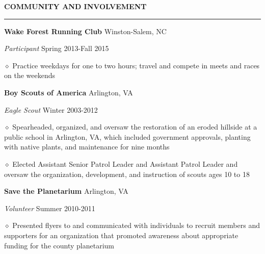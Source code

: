 \documentclass[executivepaper]{extarticle}
\begin{document}
\begin{center}
{\begin{minipage}{7.0in}
\vspace{3mm}


{\noindent \textbf{\fontsize{10}{9}\selectfont COMMUNITY AND INVOLVEMENT}}

\vspace{-3mm}

\noindent \rule{\textwidth}{0.5pt}

\vspace{-1mm}

{\noindent \textbf{\fontsize{9}{8}\selectfont Wake Forest Running Club}} {\hfill \fontsize{9}{8}\selectfont Winston-Salem, NC}

{\noindent \textit{\fontsize{9}{8}\selectfont Participant}} {\hfill \fontsize{9}{8}\selectfont Spring 2013-Fall 2015}

{\noindent $\diamond$ {\fontsize{9}{8}\selectfont Practice weekdays for one to two hours; travel and compete in meets and races on the weekends}}

{\noindent \textbf{\fontsize{9}{8}\selectfont Boy Scouts of America}} {\hfill \fontsize{9}{8}\selectfont Arlington, VA}

{\noindent \textit{\fontsize{9}{8}\selectfont Eagle Scout}} {\hfill \fontsize{9}{8}\selectfont Winter 2003-2012}

{\noindent $\diamond$ {\fontsize{9}{8}\selectfont Spearheaded, organized, and oversaw the restoration of an eroded hillside at a public school in Arlington, VA, which included government
approvals, planting with native plants, and maintenance for nine months}}

{\noindent $\diamond$ {\fontsize{9}{8}\selectfont Elected Assistant Senior Patrol Leader and Assistant Patrol Leader and oversaw the organization, development, and instruction of scouts ages 10 to 18}}

{\noindent \textbf{\fontsize{9}{8}\selectfont Save the Planetarium}} {\hfill \fontsize{9}{8}\selectfont Arlington, VA}

{\noindent \textit{\fontsize{9}{8}\selectfont Volunteer}} {\hfill \fontsize{9}{8}\selectfont Summer 2010-2011}

{\noindent $\diamond$ {\fontsize{9}{8}\selectfont Presented flyers to and communicated with individuals to recruit members and supporters for an organization that promoted awareness about appropriate funding
for the county planetarium}}


\end{minipage}}
\end{center}
\end{document}
